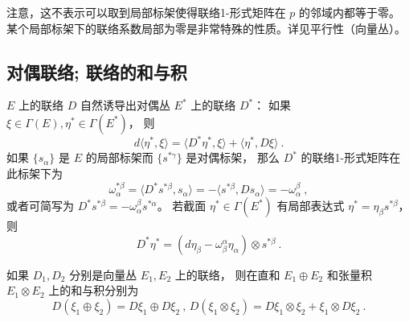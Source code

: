 注意，这不表示可以取到局部标架使得联络1-形式矩阵在 $p$ 的邻域内都等于零。 某个局部标架下的联络系数局部为零是非常特殊的性质。详见平行性（向量丛）。

\subsection{对偶联络; 联络的和与积}
$E$ 上的联络 $D$ 自然诱导出对偶丛 $E^*$ 上的联络 $D^*$： 如果 $\xi\in\Gamma(E),\eta^*\in\Gamma(E^*)$， 则
$$
d\langle \eta^*,\xi\rangle=\langle D^*\eta^*,\xi\rangle+\langle \eta^*,D\xi\rangle~.
$$
如果 $\{s_\alpha\}$ 是 $E$ 的局部标架而 $\{s^{*\gamma}\}$ 是对偶标架， 那么 $D^*$ 的联络1-形式矩阵在此标架下为
$$
\omega^{*\beta}_\alpha
=\langle D^*s^{*\beta},s_\alpha\rangle
=-\langle s^{*\beta},Ds_\alpha\rangle
=-\omega^\beta_\alpha~,
$$
或者可简写为 $D^*s^{*\beta}=-\omega^\beta_\alpha s^{*\alpha}$。 若截面 $\eta^*\in\Gamma(E^*)$ 有局部表达式 $\eta^*=\eta_\beta s^{*\beta}$， 则
$$
D^*\eta^*=(d\eta_\beta-\omega_\beta^\alpha\eta_\alpha)\otimes s^{*\beta}~.
$$

如果 $D_1,D_2$ 分别是向量丛 $E_1,E_2$ 上的联络， 则在直和 $E_1\oplus E_2$ 和张量积 $E_1\otimes E_2$ 上的和与积分别为
$$
D(\xi_1\oplus \xi_2)=D\xi_1\oplus D\xi_2~,
\,
D(\xi_1\otimes \xi_2)=D\xi_1\otimes \xi_2+\xi_1\otimes D\xi_2~.
$$